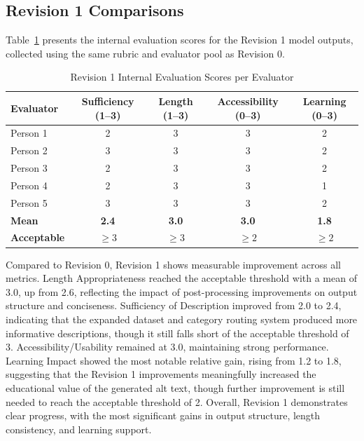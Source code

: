 \documentclass[11pt]{article}
\begin{document}
\subsection{Revision 1 Comparisons}

Table~\ref{tab:rev1} presents the internal evaluation scores for the Revision 1 model outputs, 
collected using the same rubric and evaluator pool as Revision 0.

\begin{table}[t]
\centering
\caption{Revision 1 Internal Evaluation Scores per Evaluator}
\label{tab:rev1}
\begin{tabular}{lcccc}
\toprule
\textbf{Evaluator} & \textbf{Sufficiency (1--3)} & \textbf{Length (1--3)} & \textbf{Accessibility (0--3)} & \textbf{Learning (0--3)} \\
\midrule
Person 1 & 2 & 3 & 3 & 2 \\
Person 2 & 3 & 3 & 3 & 2 \\
Person 3 & 2 & 3 & 3 & 2 \\
Person 4 & 2 & 3 & 3 & 1 \\
Person 5 & 3 & 3 & 3 & 2 \\
\midrule
\textbf{Mean}       & \textbf{2.4} & \textbf{3.0} & \textbf{3.0} & \textbf{1.8} \\
\textbf{Acceptable} & $\geq 3$     & $\geq 3$     & $\geq 2$     & $\geq 2$     \\
\bottomrule
\end{tabular}
\end{table}

Compared to Revision 0, Revision 1 shows measurable improvement across all metrics. 
Length Appropriateness reached the acceptable threshold with a mean of 3.0, up from 
2.6, reflecting the impact of post-processing improvements on output structure and 
conciseness. Sufficiency of Description improved from 2.0 to 2.4, indicating that 
the expanded dataset and category routing system produced more informative descriptions, 
though it still falls short of the acceptable threshold of 3. Accessibility/Usability 
remained at 3.0, maintaining strong performance. Learning Impact showed the most 
notable relative gain, rising from 1.2 to 1.8, suggesting that the Revision 1 
improvements meaningfully increased the educational value of the generated alt text, 
though further improvement is still needed to reach the acceptable threshold of 2. 
Overall, Revision 1 demonstrates clear progress, with the most significant gains 
in output structure, length consistency, and learning support.
\end{document}
